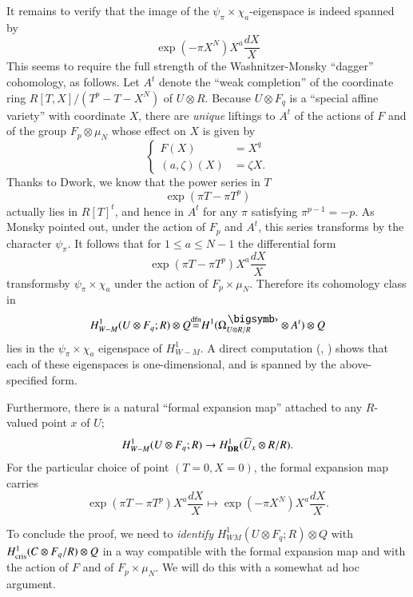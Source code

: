 It remains to verify that the image of the $\psi_{\pi}\times \chi_{a}$-eigenspace is indeed spanned by
$$
\exp(-\pi X^{N})X^{a}\frac{dX}{X}
$$
This seems to require the full strength of the Washnitzer-Monsky ``dagger'' cohomology, as follows. Let $A^{t}$ denote the ``weak completion'' of the coordinate ring $R[T,X]/(T^{p}-T-X^{N})$ of $U\otimes R$. Because $U\otimes F_{q}$ is a ``special affine variety'' with coordinate $X$, there are {\em unique} liftings to $A^{t}$ of the actions of $F$ and of the group $F_{p}\otimes \mu_{N}$ whose effect on $X$ is given by
$$
\left\{
\begin{aligned}
F(X) &= X^{q}\\
(a,\zeta)(X) &= \zeta X.
\end{aligned}
\right.
$$
Thanks to Dwork, we know that the power series in $T$
$$
\exp (\pi T-\pi T^{p})
$$
actually lies in $R[T]^{t}$, and hence in $A^{t}$ for any $\pi$ satisfying $\pi^{p-1}=-p$. As Monsky pointed out, under the action of $F_{p}$ and $A^{t}$, this series transforms by the character $\psi_{\pi}$. It follows that for $1\leq a\leq N-1$ the differential form
$$
\exp (\pi T-\pi T^{p})X^{a}\frac{dX}{X}
$$
transforms\pageoriginale by $\psi_{\pi}\times \chi_{a}$ under the action of $F_{p}\times \mu_{N}$. Therefore its cohomology class in
$$
H^{1}_{W-M}(U\otimes F_{q};R)\otimes Q{\displaystyle{\mathop{=}\limits^{\text{dfn}}}}H^{1}(\Omega^{\bigdot}_{U\otimes R/R}\otimes A^{t})\otimes Q
$$
lies in the $\psi_{\pi}\times \chi_{a}$ eigenspace of $H^{1}_{W-M}$. A direct computation (\cite{art6-key31}, \cite{art6-key32}) shows that each of these eigenspaces is one-dimensional, and is spanned by the above-specified form.

Furthermore, there is a natural ``formal expansion map'' attached to any $R$-valued point $x$ of $U$;
$$
H^{1}_{W-M}(U\otimes F_{q};R)\to H^{1}_{\mathbf{DR}}(\widehat{U}_{x}\otimes R/R).
$$
For the particular choice of point $(T=0,X=0)$, the formal expansion map carries
$$
\exp (\pi T-\pi T^{p})X^{a}\frac{dX}{X}\mapsto \exp (-\pi X^{N})X^{a}\dfrac{dX}{X}.
$$

To conclude the proof, we need to {\em identify} $H^{1}_{WM}(U\otimes F_{q};R)\otimes Q$ with $H^{1}_{\operatorname{cris}}(C\otimes F_{q}/R)\otimes Q$ in a way compatible with the formal expansion map and with the action of $F$ and of $F_{p}\times \mu_{N}$. We will do this with a somewhat ad hoc argument.

